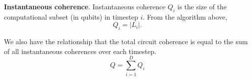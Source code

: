 \begin{definition}{\textbf{Instantaneous coherence}.}
Instantaneous coherence $Q_i$ is the size of the computational subset
(in qubits) in timestep $i$. From the algorithm above,
\begin{equation}
Q_i = |L_i|\text{.}
\end{equation}

We also have the relationship that the total circuit coherence is equal
to the sum of all instantaneous coherences over each timestep.
\begin{equation}
Q = \sum_{i=1}^D Q_i
\end{equation}
\end{definition}